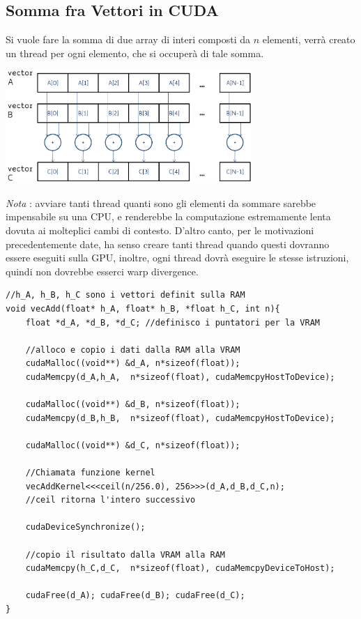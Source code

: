 \documentclass[10pt, letterpaper]{report}
\begin{document}
\subsection{Somma fra Vettori in CUDA}
Si vuole fare la somma di due array di interi composti da $n$ elementi, verrà creato un thread per ogni elemento, che si occuperà di tale somma.\begin{center}
    \includegraphics[width=0.7\textwidth ]{images/vectorSum.png}
\end{center}
\textit{Nota} : avviare tanti thread quanti sono gli elementi da sommare sarebbe impensabile su una CPU, e renderebbe la computazione estremamente lenta dovuta ai molteplici cambi di contesto. D'altro canto, per le motivazioni precedentemente date, ha senso creare tanti thread quando questi dovranno essere eseguiti sulla GPU, inoltre, ogni thread dovrà eseguire le stesse istruzioni, quindi non dovrebbe esserci warp divergence. 
\begin{lstlisting}[style=CStyle]
//h_A, h_B, h_C sono i vettori definit sulla RAM
void vecAdd(float* h_A, float* h_B, *float h_C, int n){ 
    float *d_A, *d_B, *d_C; //definisco i puntatori per la VRAM

    //alloco e copio i dati dalla RAM alla VRAM 
    cudaMalloc((void**) &d_A, n*sizeof(float));
    cudaMemcpy(d_A,h_A,  n*sizeof(float), cudaMemcpyHostToDevice);

    cudaMalloc((void**) &d_B, n*sizeof(float));
    cudaMemcpy(d_B,h_B,  n*sizeof(float), cudaMemcpyHostToDevice);

    cudaMalloc((void**) &d_C, n*sizeof(float));

    //Chiamata funzione kernel
    vecAddKernel<<<ceil(n/256.0), 256>>>(d_A,d_B,d_C,n);
    //ceil ritorna l'intero successivo

    cudaDeviceSynchronize();

    //copio il risultato dalla VRAM alla RAM
    cudaMemcpy(h_C,d_C,  n*sizeof(float), cudaMemcpyDeviceToHost);

    cudaFree(d_A); cudaFree(d_B); cudaFree(d_C);
}
\end{lstlisting}
\end{document}
